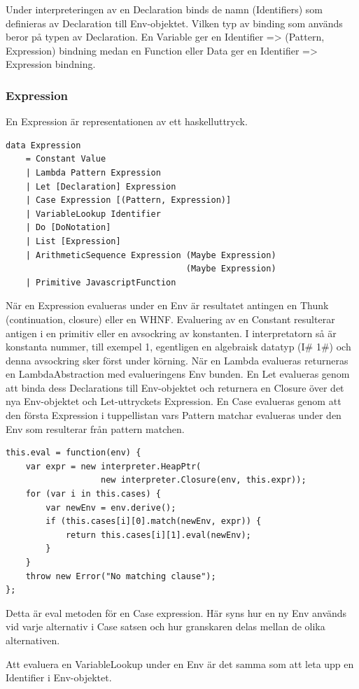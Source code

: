 Under interpreteringen av en Declaration binds de namn (Identifiers) som definieras av Declaration till Env-objektet. Vilken typ av binding som används beror på typen av Declaration. En Variable ger en Identifier => (Pattern, Expression) bindning medan en Function eller Data ger en Identifier => Expression bindning.

\subsubsection{Expression}
En Expression är representationen av ett haskelluttryck.

\begin{lstlisting}
data Expression 
    = Constant Value
    | Lambda Pattern Expression
    | Let [Declaration] Expression
    | Case Expression [(Pattern, Expression)]
    | VariableLookup Identifier
    | Do [DoNotation]
    | List [Expression]
    | ArithmeticSequence Expression (Maybe Expression) 
                                    (Maybe Expression)
    | Primitive JavascriptFunction
\end{lstlisting}

När en Expression evalueras under en Env är resultatet antingen en Thunk (continuation, closure) eller en WHNF. Evaluering av en Constant resulterar antigen i en primitiv eller en avsockring av konstanten. I interpretatorn så är konstanta nummer, till exempel 1, egentligen en algebraisk datatyp (I\# 1\#) och denna avsockring sker först under körning. När en Lambda evalueras returneras en LambdaAbstraction med evalueringens Env bunden. En Let evalueras genom att binda dess Declarations till Env-objektet och returnera en Closure över det nya Env-objektet och Let-uttryckets Expression. En Case evalueras genom att den första Expression i tuppellistan vars Pattern matchar evalueras under den Env som resulterar från pattern matchen.
\begin{lstlisting}
this.eval = function(env) {
    var expr = new interpreter.HeapPtr(
                   new interpreter.Closure(env, this.expr));
    for (var i in this.cases) {
        var newEnv = env.derive();
        if (this.cases[i][0].match(newEnv, expr)) {
            return this.cases[i][1].eval(newEnv);
        }
    }
    throw new Error("No matching clause");
};
\end{lstlisting}
Detta är eval metoden för en Case expression. Här syns hur en ny Env används vid varje alternativ i Case satsen och hur granskaren delas mellan de olika alternativen.

Att evaluera en VariableLookup under en Env är det samma som att leta upp en Identifier i Env-objektet.

